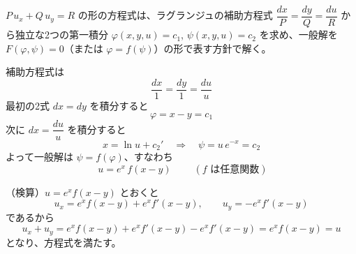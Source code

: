 
$P\,u_{x} + Q\,u_{y} = R$ の形の方程式は、ラグランジュの補助方程式
$\dfrac{dx}{P} = \dfrac{dy}{Q} = \dfrac{du}{R}$ から独立な2つの第一積分
$\varphi(x,y,u) = c_{1}$, $\psi(x,y,u) = c_{2}$ を求め、一般解を
$F(\varphi, \psi) = 0$（または $\varphi = f(\psi)$）の形で表す方針で解く。

補助方程式は
\[
\frac{dx}{1} = \frac{dy}{1} = \frac{du}{u}
\]
最初の2式 $dx = dy$ を積分すると
\[
\varphi = x - y = c_{1}
\]
次に $dx = \dfrac{du}{u}$ を積分すると
\[
x = \ln u + c_{2}' \quad\Longrightarrow\quad \psi = u\,e^{-x} = c_{2}
\]
よって一般解は $\psi = f(\varphi)$、すなわち
\[
\boxed{\; u = e^{x}\,f(x - y) \;}
\qquad (f \text{ は任意関数})
\]

（検算）$u = e^{x} f(x-y)$ とおくと
\[
u_{x} = e^{x} f(x-y) + e^{x} f'(x-y), \qquad
u_{y} = -e^{x} f'(x-y)
\]
であるから
\[
u_{x} + u_{y} = e^{x} f(x-y) + e^{x} f'(x-y) - e^{x} f'(x-y) = e^{x} f(x-y) = u
\]
となり、方程式を満たす。
